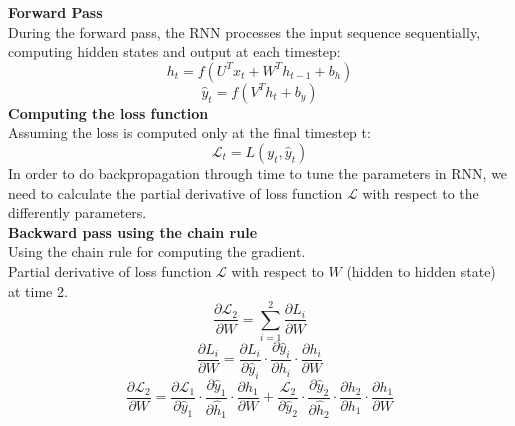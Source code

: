 \documentclass[12pt,a4paper]{article}
\begin{document}
\noindent \textbf{Forward Pass}
\\[1ex]
During the forward pass, the RNN processes the input sequence sequentially, computing hidden states and output at each timestep:
\begin{equation}
    h_t = f(U^Tx_{t}+W^Th_{t-1}+b_h)
\end{equation}
\begin{equation}
    \hat{y}_t = f(V^Th_t+b_y)
\end{equation}
\newline  %
\noindent \textbf{Computing the loss function}
\\[1ex]
Assuming the loss is computed only at the final timestep t:
\begin{equation}
    \mathcal{L}_t = L(y_t, \hat{y}_t)
\end{equation}
In order to do backpropagation through time to tune the parameters in RNN, we need to calculate the partial derivative of loss function $\mathcal{L}$ with respect to the differently parameters.\\
\newline  %
\noindent \textbf{Backward pass using the chain rule}
\\[1ex]
Using the chain rule for computing the gradient.\\
Partial derivative of loss function $\mathcal{L}$ with respect to $W$ (hidden to hidden state) at time 2. 
\begin{equation}
    \dfrac{\partial\mathcal{L}_2}{\partial{W}} = \sum_{i=1}^{2}\dfrac{\partial L_i}{\partial W}
\end{equation}
\begin{equation}
    \dfrac{\partial L_i}{\partial W} = \dfrac{\partial L_i}{\partial \hat{y}_i} \cdot \dfrac{\partial \hat{y}_i}{\partial h_i} \cdot \dfrac{\partial h_i}{\partial W}
\end{equation}
\begin{equation}
    \dfrac{\partial\mathcal{L}_2}{\partial W} = \dfrac{\partial\mathcal{L}_1}{\partial\hat{y}_1}\cdot\dfrac{\partial\hat{y}_1}{\partial\hat{h}_1}\cdot\dfrac{\partial h_1}{\partial W}+\dfrac{\mathcal{L}_2}{\partial\hat{y}_2}\cdot\dfrac{\partial\hat{y}_2}{\partial\hat{h}_2}\cdot\dfrac{\partial h_2}{\partial h_1}\cdot\dfrac{\partial h_1}{\partial W}
\end{equation}
\end{document}
